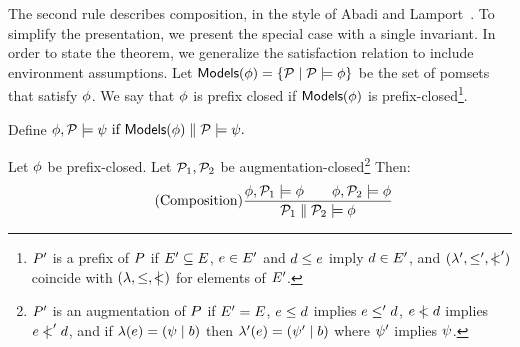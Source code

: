 The second rule describes composition, in the style of Abadi and
Lamport~\cite{Abadi:1993:CS:151646.151649}.  To simplify the presentation, we
present the special case with a single invariant.
In order to state the theorem, we generalize the satisfaction relation to
include environment assumptions.  Let
\begin{math}
  \textsf{Models}{(\phi)} = \{ \mathcal{P} \mid \mathcal{P} \models \phi \}
\end{math}
be the set of pomsets that satisfy $\phi$.  We say that $\phi$ is prefix
closed if $\textsf{Models}{(\phi)}$ is prefix-closed\footnote{$P'$ is a prefix of
  $P$ if $E'\subseteq E$, $e\in E'$ and $ d\le e$
  imply $d\in E'$, and $(\lambda',\leq',\mathrel{\,\mid\!\!\!<}')$ coincide with
  $(\lambda,\leq,\mathrel{\,\mid\!\!\!<})$ for elements of $E'$.}.
\begin{noenv}
  Define
  \begin{math}
    \phi, \mathcal{P} \models \psi  \text{ if } \textsf{Models}{(\phi)} \parallel \mathcal{P} \models \psi.
  \end{math}
\end{noenv}
\begin{proposition}%
  Let $\phi$ be prefix-closed.  Let $\mathcal{P}_1, \mathcal{P}_2$ be
  augmentation-closed\footnote{$P'$ is an augmentation of $P$ if
    $E'=E$, $e\le d$ implies $e\le'd$, $e\mathrel{\,\mid\!\!\!<}d$
    implies $e\mathrel{\,\mid\!\!\!<}'d$, and
    if $\lambda(e) = (\psi \mid b)$ then
    $\lambda'(e) = (\psi' \mid b)$ where $\psi'$ implies
    $\psi$.}  Then:
  \begin{displaymath}
    \tag{Composition}
    \frac{
      \phi, \mathcal{P}_1 \models\phi
      \qquad
      \phi, \mathcal{P}_2 \models\phi
    }{\mathcal{P}_1 \parallel \mathcal{P}_2 \models \phi}
  \end{displaymath}
\end{proposition}
